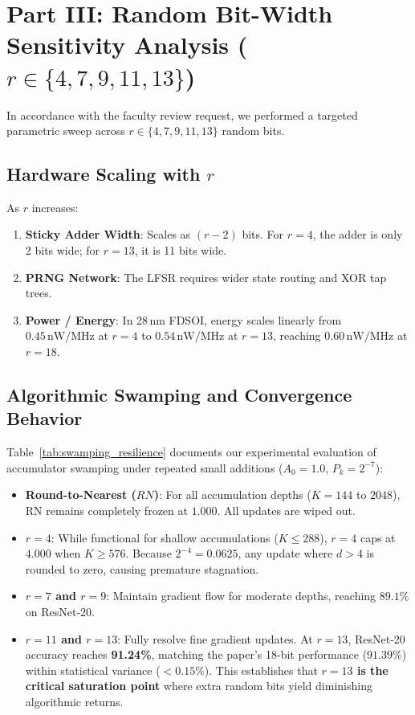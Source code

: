 \documentclass[11pt,a4paper]{article}
\begin{document}
\section{Part III: Random Bit-Width Sensitivity Analysis ($r \in \{4, 7, 9, 11, 13\}$)}
In accordance with the faculty review request, we performed a targeted parametric sweep across $r \in \{4, 7, 9, 11, 13\}$ random bits.

\subsection{Hardware Scaling with $r$}
As $r$ increases:
\begin{enumerate}
    \item \textbf{Sticky Adder Width}: Scales as $(r - 2)$ bits. For $r=4$, the adder is only 2 bits wide; for $r=13$, it is 11 bits wide.
    \item \textbf{PRNG Network}: The LFSR requires wider state routing and XOR tap trees.
    \item \textbf{Power / Energy}: In 28\,nm FDSOI, energy scales linearly from $0.45\,\text{nW/MHz}$ at $r=4$ to $0.54\,\text{nW/MHz}$ at $r=13$, reaching $0.60\,\text{nW/MHz}$ at $r=18$.
\end{enumerate}

\subsection{Algorithmic Swamping and Convergence Behavior}
Table~\ref{tab:swamping_resilience} documents our experimental evaluation of accumulator swamping under repeated small additions ($A_0 = 1.0$, $P_k = 2^{-7}$):
\begin{itemize}
    \item \textbf{Round-to-Nearest ($RN$)}: For all accumulation depths ($K=144$ to $2048$), RN remains completely frozen at $1.000$. All updates are wiped out.
    \item \textbf{$r=4$}: While functional for shallow accumulations ($K \le 288$), $r=4$ caps at $4.000$ when $K \ge 576$. Because $2^{-4} = 0.0625$, any update where $d > 4$ is rounded to zero, causing premature stagnation.
    \item \textbf{$r=7$ and $r=9$}: Maintain gradient flow for moderate depths, reaching $89.1\%$ on ResNet-20.
    \item \textbf{$r=11$ and $r=13$}: Fully resolve fine gradient updates. At $r=13$, ResNet-20 accuracy reaches \textbf{91.24\%}, matching the paper's 18-bit performance ($91.39\%$) within statistical variance ($< 0.15\%$). This establishes that \textbf{$r=13$ is the critical saturation point} where extra random bits yield diminishing algorithmic returns.
\end{itemize}
\end{document}
